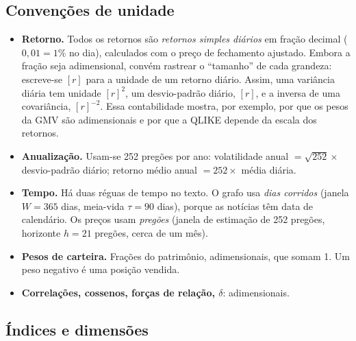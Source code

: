 \documentclass[11pt,a4paper]{article}
\newcommand{\ur}{[r]}           %
\begin{document}
\subsection{Convenções de unidade}

\begin{itemize}
  \item \textbf{Retorno.} Todos os retornos são \emph{retornos simples diários} em fração decimal
        ($0{,}01 = 1\%$ no dia), calculados com o preço de fechamento ajustado. Embora a fração seja
        adimensional, convém rastrear o ``tamanho'' de cada grandeza: escreve-se $\ur$ para a unidade
        de um retorno diário. Assim, uma variância diária tem unidade $\ur^2$, um desvio-padrão diário,
        $\ur$, e a inversa de uma covariância, $\ur^{-2}$. Essa contabilidade mostra, por exemplo, por que
        os pesos da GMV são adimensionais e por que a QLIKE depende da escala dos retornos.
  \item \textbf{Anualização.} Usam-se 252 pregões por ano: volatilidade anual $=\sqrt{252}\times$
        desvio-padrão diário; retorno médio anual $=252\times$ média diária.
  \item \textbf{Tempo.} Há duas réguas de tempo no texto. O grafo usa \emph{dias corridos} (janela
        $W=365$ dias, meia-vida $\tau=90$ dias), porque as notícias têm data de calendário. Os preços usam
        \emph{pregões} (janela de estimação de 252 pregões, horizonte $h=21$ pregões, cerca de um mês).
  \item \textbf{Pesos de carteira.} Frações do patrimônio, adimensionais, que somam 1. Um peso negativo
        é uma posição vendida.
  \item \textbf{Correlações, cossenos, forças de relação, $\delta$}: adimensionais.
\end{itemize}

\subsection{Índices e dimensões}
\end{document}
